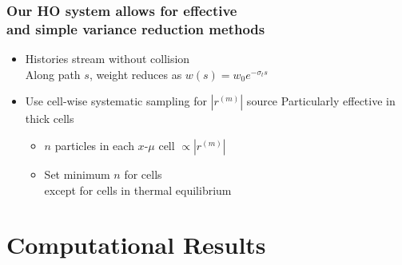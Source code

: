 \documentclass[xcolor=dvipsnames,hyperref={pdfpagelabels=false},unknownkeysallowed]{beamer}
\newcommand{\colG}[1]{{\color{Gray!110} #1}}
\newlength{\wideitemsep}
\let\olditem\item
\renewcommand{\item}{\setlength{\itemsep}{\wideitemsep}\olditem}
\begin{document}
\begin{frame}
    \frametitle{Our HO system allows for effective \\ and simple variance reduction methods}
    \addtolength{\wideitemsep}{0.15in}
    \begin{itemize}
        \item[] Histories stream without collision \\
            \colG{Along path $s$, weight reduces as $w(s)=w_0 e^{-\sigma_t s}$}
        \item[] Use cell-wise {systematic} sampling for $|r^{(m)}|$ source
            \colG{Particularly effective in thick cells}
            \begin{itemize}
                    \vspace{0.02in}
                \item $n$ particles in  each $x$-$\mu$ cell $\propto |r^{(m)}|$
                \vspace{-0.15in}
                \item Set minimum $n$ for cells  \\
                    \colG{except for cells in thermal equilibrium}
            \end{itemize}
    \end{itemize}
\end{frame}


\section{Computational Results}
\subsection{}
\end{document}

